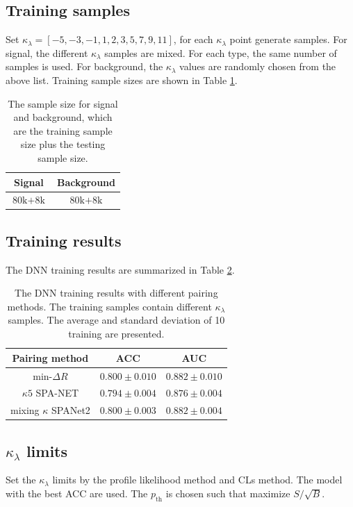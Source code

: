 \documentclass[12pt]{article}
\begin{document}
	\subsection{Training samples}%
	\label{sub:training_samples2}
	Set $\kappa_\lambda = [-5, -3, -1, 1, 2, 3, 5, 7, 9, 11]$, for each $\kappa_\lambda$ point generate samples. For signal, the different $\kappa_\lambda$ samples are mixed. For each type, the same number of samples is used. For background, the $\kappa_\lambda$ values are randomly chosen from the above list. Training sample sizes are shown in Table \ref{tab:DNN_sample_size3}.
		\begin{table}[htpb]
			\centering
			\caption{The sample size for signal and background, which are the training sample size plus the testing sample size.}
			\label{tab:DNN_sample_size3}
			\begin{tabular}{c|c}
			 Signal & Background\\ \hline
			 $\text{80k} + \text{8k}$      &$\text{80k} + \text{8k}$ 
			\end{tabular}
		\end{table}

	\subsection{Training results}%
	\label{sub:training_results}
		The DNN training results are summarized in Table \ref{tab:DNN_results}.
		\begin{table}[htpb]
			\centering
			\caption{The DNN training results with different pairing methods. The training samples contain different $\kappa_\lambda$ samples. The average and standard deviation of 10 training are presented.}
			\label{tab:DNN_results}
			\begin{tabular}{c|cc}
			Pairing method        & ACC     & AUC   \\ \hline
			$\text{min-}\Delta R$ & $0.800 \pm 0.010$ & $0.882 \pm 0.010$ \\
			$\kappa 5$ SPA-NET    & $0.794 \pm 0.004$ & $0.876 \pm 0.004$ \\
			mixing $\kappa$ SPANet2 & $0.800 \pm 0.003$ & $0.882 \pm 0.004$ \\
			\end{tabular}      
		\end{table}
	
	\subsection{\texorpdfstring{$\kappa_\lambda$}{kappa} limits}%
	\label{sub:kappa_limits}
		Set the $\kappa_\lambda$ limits by the profile likelihood method and CLs method. The model with the best ACC are used. The $p_\text{th}$ is chosen such that maximize $S / \sqrt{B}$.
\end{document}
